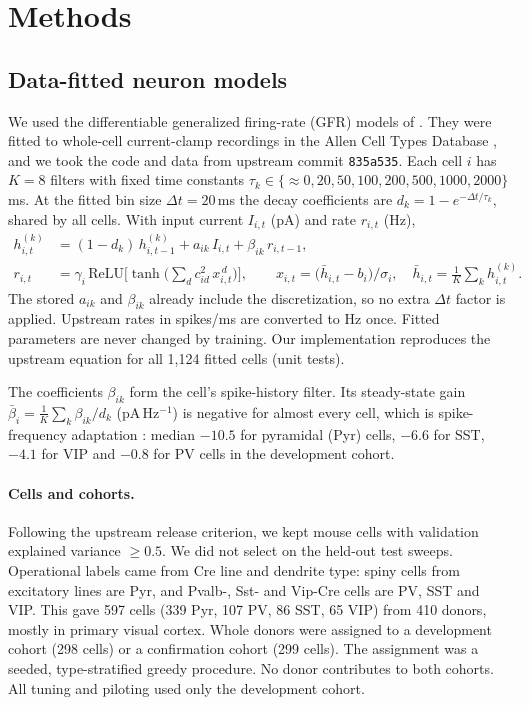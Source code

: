 \section{Methods}\label{sec:methods}

\subsection{Data-fitted neuron models}
We used the differentiable generalized firing-rate (GFR) models of \citet{yeung2025gfr}.
They were fitted to whole-cell current-clamp recordings in the Allen Cell Types Database
\citep{gouwens2019}, and we took the code and data from upstream commit \texttt{835a535}. Each
cell $i$ has $K=8$ filters with fixed time constants
$\tau_k\in\{{\approx}0, 20, 50, 100, 200, 500, 1000, 2000\}$\,ms. At the fitted bin size
$\Delta t=20$\,ms the decay coefficients are $d_k = 1-e^{-\Delta t/\tau_k}$, shared by all cells.
With input current $I_{i,t}$ (pA) and rate $r_{i,t}$ (Hz),
\begin{align}
h^{(k)}_{i,t} &= (1-d_k)\,h^{(k)}_{i,t-1} + a_{ik}\,I_{i,t} + \beta_{ik}\,r_{i,t-1},\label{eq:gfr-h}\\
r_{i,t} &= \gamma_i\,\mathrm{ReLU}\!\Big[\tanh\Big(\textstyle\sum_{d}c_{id}^2\,x_{i,t}^{\,d}\Big)\Big],
\qquad x_{i,t}=\big(\bar h_{i,t}-b_i\big)/\sigma_i,\quad \bar h_{i,t}=\tfrac1K\textstyle\sum_k h^{(k)}_{i,t}.\label{eq:gfr-r}
\end{align}
The stored $a_{ik}$ and $\beta_{ik}$ already include the discretization, so no extra $\Delta t$
factor is applied. Upstream rates in spikes/ms are converted to Hz once. Fitted parameters are
never changed by training. Our implementation reproduces the upstream equation for all 1,124
fitted cells (unit tests).

The coefficients $\beta_{ik}$ form the cell's spike-history filter. Its steady-state gain
$\bar\beta_i=\tfrac1K\sum_k\beta_{ik}/d_k$ (pA\,Hz$^{-1}$) is negative for almost every cell,
which is spike-frequency adaptation \citep{benda2003,weber2017glm}: median $-10.5$ for pyramidal
(Pyr) cells, $-6.6$ for SST, $-4.1$ for VIP and $-0.8$ for PV cells in the development cohort.

\paragraph{Cells and cohorts.}
Following the upstream release criterion, we kept mouse cells with validation explained
variance $\ge0.5$. We did not select on the held-out test sweeps. Operational labels came from
Cre line and dendrite type: spiny cells from excitatory lines are Pyr, and Pvalb-, Sst- and
Vip-Cre cells are PV, SST and VIP. This gave 597 cells (339 Pyr, 107 PV, 86 SST, 65 VIP) from 410
donors, mostly in primary visual cortex. Whole donors were assigned to a development cohort (298
cells) or a confirmation cohort (299 cells). The assignment was a seeded, type-stratified greedy
procedure. No donor contributes to both cohorts. All tuning and piloting used only the development
cohort.

